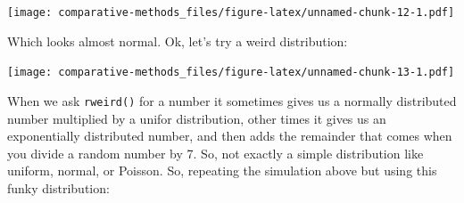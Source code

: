 \documentclass[]{article}
\newenvironment{Shaded}{\begin{snugshade}}{\end{snugshade}}
\newcommand{\ControlFlowTok}[1]{\textcolor[rgb]{0.13,0.29,0.53}{\textbf{#1}}}
\newcommand{\DataTypeTok}[1]{\textcolor[rgb]{0.13,0.29,0.53}{#1}}
\newcommand{\DecValTok}[1]{\textcolor[rgb]{0.00,0.00,0.81}{#1}}
\newcommand{\FloatTok}[1]{\textcolor[rgb]{0.00,0.00,0.81}{#1}}
\newcommand{\KeywordTok}[1]{\textcolor[rgb]{0.13,0.29,0.53}{\textbf{#1}}}
\newcommand{\NormalTok}[1]{#1}
\newcommand{\OperatorTok}[1]{\textcolor[rgb]{0.81,0.36,0.00}{\textbf{#1}}}
\newcommand{\StringTok}[1]{\textcolor[rgb]{0.31,0.60,0.02}{#1}}
\begin{document}
\texttt{[image: comparative-methods\_files/figure-latex/unnamed-chunk-12-1.pdf]}

Which looks almost normal. Ok, let's try a weird distribution:

\begin{Shaded}
\end{Shaded}

\texttt{[image: comparative-methods\_files/figure-latex/unnamed-chunk-13-1.pdf]}

When we ask \texttt{rweird()} for a number it sometimes gives us a normally distributed number multiplied by a unifor distribution, other times it gives us an exponentially distributed number, and then adds the remainder that comes when you divide a random number by 7. So, not exactly a simple distribution like uniform, normal, or Poisson. So, repeating the simulation above but using this funky distribution:
\end{document}
